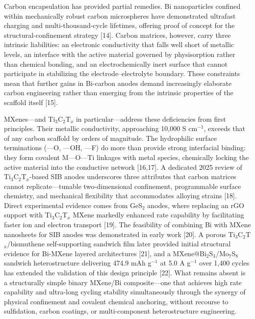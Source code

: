 Carbon encapsulation has provided partial remedies. Bi nanoparticles confined within mechanically robust carbon microspheres have demonstrated ultrafast charging and multi-thousand-cycle lifetimes, offering proof of concept for the structural-confinement strategy [14]. Carbon matrices, however, carry three intrinsic liabilities: an electronic conductivity that falls well short of metallic levels, an interface with the active material governed by physisorption rather than chemical bonding, and an electrochemically inert surface that cannot participate in stabilizing the electrode--electrolyte boundary. These constraints mean that further gains in Bi-carbon anodes demand increasingly elaborate carbon engineering rather than emerging from the intrinsic properties of the scaffold itself [15].

MXenes---and Ti$_{3}$C$_{2}$T$_{x}$ in particular---address these deficiencies from first principles. Their metallic conductivity, approaching 10,000 S cm$^{-1}$, exceeds that of any carbon scaffold by orders of magnitude. The hydrophilic surface terminations (---O, ---OH, ---F) do more than provide strong interfacial binding: they form covalent M---O---Ti linkages with metal species, chemically locking the active material into the conductive network [16,17]. A dedicated 2025 review of Ti$_{3}$C$_{2}$T$_{x}$-based SIB anodes underscores three attributes that carbon matrices cannot replicate---tunable two-dimensional confinement, programmable surface chemistry, and mechanical flexibility that accommodates alloying strains [18]. Direct experimental evidence comes from GeS$_{2}$ anodes, where replacing an rGO support with Ti$_{3}$C$_{2}$T$_{x}$ MXene markedly enhanced rate capability by facilitating faster ion and electron transport [19]. The feasibility of combining Bi with MXene nanosheets for SIB anodes was demonstrated in early work [20]. A porous Ti$_{3}$C$_{2}$T$_{x}$/bismuthene self-supporting sandwich film later provided initial structural evidence for Bi-MXene layered architectures [21], and a MXene@Bi$_{2}$S$_{3}$/Mo$_{7}$S$_{8}$ sandwich heterostructure delivering 474.9 mAh g$^{-1}$ at 5.0 A g$^{-1}$ over 1,400 cycles has extended the validation of this design principle [22]. What remains absent is a structurally simple binary MXene/Bi composite---one that achieves high rate capability and ultra-long cycling stability simultaneously through the synergy of physical confinement and covalent chemical anchoring, without recourse to sulfidation, carbon coatings, or multi-component heterostructure engineering.

